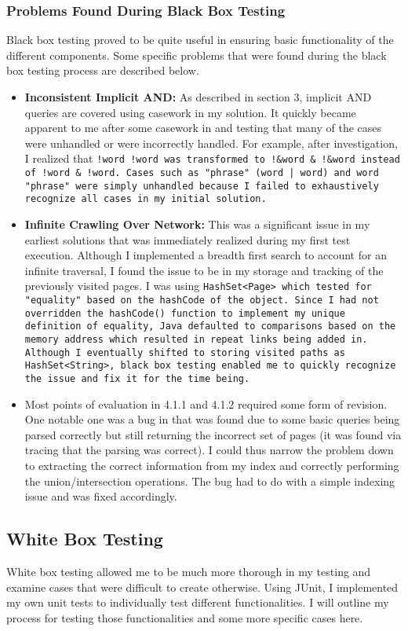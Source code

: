 \documentclass[11pt]{article}
\begin{document}
\subsubsection{Problems Found During Black Box Testing}
Black box testing proved to be quite useful in ensuring basic functionality of the different components. Some specific problems that were found during the black box testing process are described below.
\begin{itemize}
	\item \textbf{Inconsistent Implicit AND: } As described in section 3, implicit AND queries are covered using casework in my solution. It quickly became apparent to me after some casework in \WQE{} and \WI{} testing that many of the cases were unhandled or were incorrectly handled. For example, after investigation, I realized that \tt{!word !word} was transformed to \tt{!\&word \& !\&word} instead of \tt{!word \& !word}. Cases such as \tt{"phrase" (word | word)} and \tt{word "phrase"} were simply unhandled because I failed to exhaustively recognize all cases in my initial solution.
	\item \textbf{Infinite Crawling Over Network: } This was a significant issue in my earliest solutions that was immediately realized during my first test execution. Although I implemented a breadth first search to account for an infinite traversal, I found the issue to be in my storage and tracking of the previously visited pages. I was using \tt{HashSet<Page>} which tested for "equality" based on the \tt{hashCode} of the \Page{} object. Since I had not overridden the \tt{hashCode()} function to implement my unique definition of equality, Java defaulted to comparisons based on the memory address which resulted in repeat links being added in. Although I eventually shifted to storing visited paths as \tt{HashSet<String>}, black box testing enabled me to quickly recognize the issue and fix it for the time being.
	\item Most points of evaluation in 4.1.1 and 4.1.2 required some form of revision. One notable one was a bug in\WQE{} that was found due to some basic queries being parsed correctly but still returning the incorrect set of pages (it was found via tracing that the parsing was correct). I could thus narrow the problem down to extracting the correct information from my index and correctly performing the union/intersection operations. The bug had to do with a simple indexing issue and was fixed accordingly.
\end{itemize}

\subsection{White Box Testing}
White box testing allowed me to be much more thorough in my testing and examine cases that were difficult to create otherwise. Using JUnit, I  implemented my own unit tests to individually test different functionalities. I will outline my process for testing those functionalities and some more specific cases here. 
\end{document}
